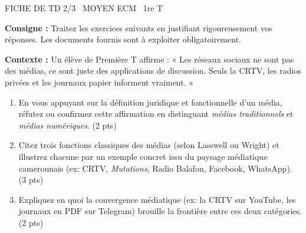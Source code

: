 \documentclass[11pt]{article}
\begin{document}
\begin{tcolorbox}[enhanced,colback=popink,colframe=popink,arc=10pt,boxrule=0pt,left=12pt,right=12pt,top=9pt,bottom=9pt]
{\color{white}\popxbold\small FICHE DE TD 2/3 \textbullet\ MOYEN \hfill ECM \textbullet\ 1re T\par}
\end{tcolorbox}
\vspace{4pt}
\noindent \textbf{Consigne :} Traitez les exercices suivants en justifiant rigoureusement vos réponses. Les documents fournis sont à exploiter obligatoirement.

\begin{exercice}
\textbf{Contexte :} Un élève de Première T affirme : « Les réseaux sociaux ne sont pas des médias, ce sont juste des applications de discussion. Seuls la CRTV, les radios privées et les journaux papier informent vraiment. »

\begin{enumerate}
    \item En vous appuyant sur la définition juridique et fonctionnelle d'un média, réfutez ou confirmez cette affirmation en distinguant \textit{médias traditionnels} et \textit{médias numériques}. (2 pts)
    \item Citez trois fonctions classiques des médias (selon Lasswell ou Wright) et illustrez chacune par un exemple concret issu du paysage médiatique camerounais (ex: CRTV, \textit{Mutations}, Radio Balafon, Facebook, WhatsApp). (3 pts)
    \item Expliquez en quoi la convergence médiatique (ex: la CRTV sur YouTube, les journaux en PDF sur Telegram) brouille la frontière entre ces deux catégories. (2 pts)
\end{enumerate}
\end{exercice}
\end{document}
